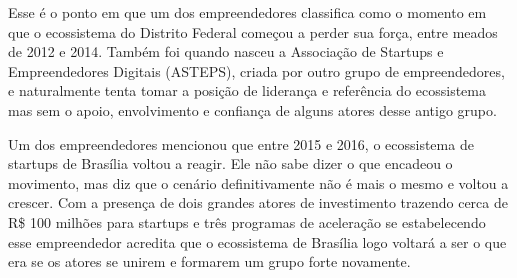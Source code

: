 Esse é o ponto em que um dos empreendedores classifica como o momento em que o ecossistema do Distrito Federal começou a perder sua força, entre meados de 2012 e 2014. Também foi quando nasceu a Associação de Startups e Empreendedores Digitais (ASTEPS), criada por outro grupo de empreendedores, e naturalmente tenta tomar a posição de liderança e referência do ecossistema mas sem o apoio, envolvimento e confiança de alguns atores desse antigo grupo.

Um dos empreendedores mencionou que entre 2015 e 2016, o ecossistema de startups de Brasília voltou a reagir. Ele não sabe dizer o que encadeou o movimento, mas diz que o cenário definitivamente não é mais o mesmo e voltou a crescer. Com a presença de dois grandes atores de investimento trazendo cerca de R\$ 100 milhões para startups e três programas de aceleração se estabelecendo esse empreendedor acredita que o ecossistema de Brasília logo voltará a ser o que era se os atores se unirem e formarem um grupo forte novamente.